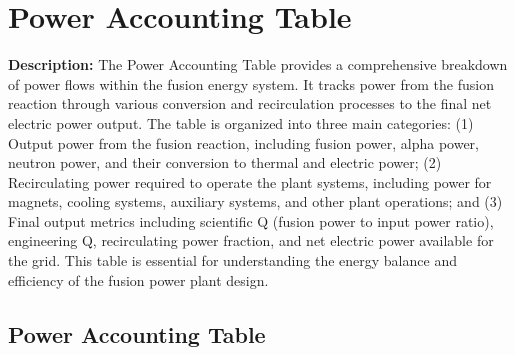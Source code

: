 \newpage
\section{Power Accounting Table}

\textbf{Description:} The Power Accounting Table provides a comprehensive breakdown of power flows within the fusion energy system. It tracks power from the fusion reaction through various conversion and recirculation processes to the final net electric power output. The table is organized into three main categories: (1) Output power from the fusion reaction, including fusion power, alpha power, neutron power, and their conversion to thermal and electric power; (2) Recirculating power required to operate the plant systems, including power for magnets, cooling systems, auxiliary systems, and other plant operations; and (3) Final output metrics including scientific Q (fusion power to input power ratio), engineering Q, recirculating power fraction, and net electric power available for the grid. This table is essential for understanding the energy balance and efficiency of the fusion power plant design.

\subsection{Power Accounting Table}

